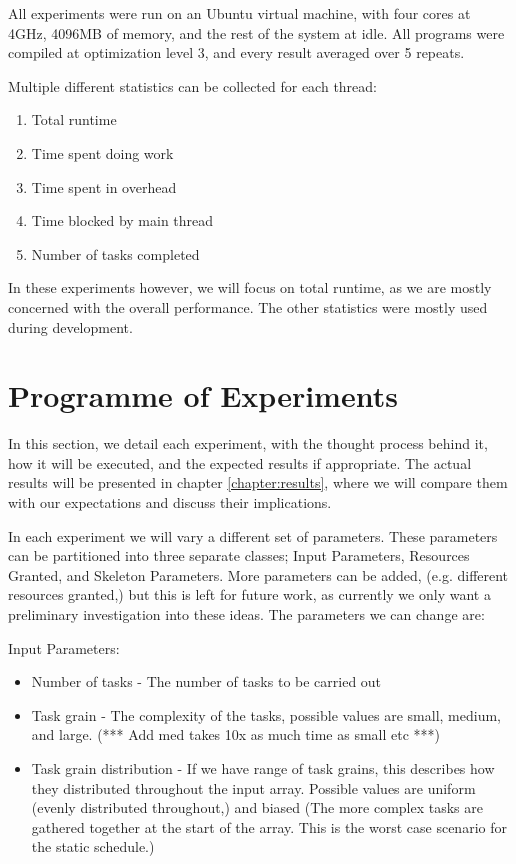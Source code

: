 All experiments were run on an Ubuntu virtual machine, with four cores at 4GHz, 4096MB of memory, and the rest of the system at idle. All programs were compiled at optimization level 3, and every result averaged over 5 repeats.

Multiple different statistics can be collected for each thread:

\begin{enumerate}
	\item Total runtime
	\item Time spent doing work
	\item Time spent in overhead
	\item Time blocked by main thread
	\item Number of tasks completed
\end{enumerate}

In these experiments however, we will focus on total runtime, as we are mostly concerned with the overall performance. The other statistics were mostly used during development.



\section{Programme of Experiments}

In this section, we detail each experiment, with the thought process behind it, how it will be executed, and the expected results if appropriate. The actual results will be presented in chapter \ref{chapter:results}, where we will compare them with our expectations and discuss their implications.

In each experiment we will vary a different set of parameters. These parameters can be partitioned into three separate classes; Input Parameters, Resources Granted, and Skeleton Parameters. More parameters can be added, (e.g. different resources granted,) but this is left for future work, as currently we only want a preliminary investigation into these ideas. The parameters we can change are:

Input Parameters:

\begin{itemize}
	\item Number of tasks - The number of tasks to be carried out
	\item Task grain - The complexity of the tasks, possible values are small, medium, and large. (*** Add med takes 10x as much time as small etc ***)
	\item Task grain distribution - If we have range of task grains, this describes how they distributed throughout the input array. Possible values are uniform (evenly distributed throughout,) and biased (The more complex tasks are gathered together at the start of the array. This is the worst case scenario for the static schedule.)
\end{itemize}


